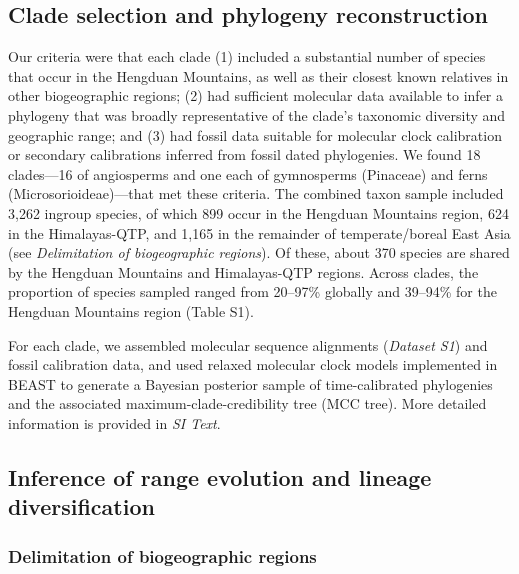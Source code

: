 
\subsection*{Clade selection and phylogeny reconstruction}

Our criteria were that each clade (1) included a substantial number of
species that occur in the Hengduan Mountains, as well as their closest
known relatives in other biogeographic regions; (2) had sufficient
molecular data available to infer a phylogeny that was broadly
representative of the clade's taxonomic diversity and geographic
range; and (3) had fossil data suitable for molecular clock
calibration or secondary calibrations inferred from fossil dated
phylogenies. We found 18 clades---16 of angiosperms and one each of
gymnosperms (Pinaceae) and ferns (Microsorioideae)---that met these
criteria. The combined taxon sample included 3,262 ingroup species, of
which 899 occur in the Hengduan Mountains region, 624 in the
Himalayas-QTP, and 1,165 in the remainder of temperate/boreal East
Asia (see \textit{Delimitation of biogeographic regions}). Of these,
about 370 species are shared by the Hengduan Mountains and
Himalayas-QTP regions. Across clades, the proportion of species
sampled ranged from 20--97\% globally and 39--94\% for the Hengduan
Mountains region (Table S1).

For each clade, we assembled molecular sequence alignments
(\textit{Dataset S1}) and fossil calibration data, and used relaxed
molecular clock models implemented in BEAST
\citep{Drummond2012,Bouckaert2014} to generate a Bayesian posterior
sample of time-calibrated phylogenies and the associated
maximum-clade-credibility tree (MCC tree).  More detailed information
is provided in \textit{SI Text}.


\subsection*{Inference of range evolution and lineage diversification}

\subsubsection*{Delimitation of biogeographic regions}

